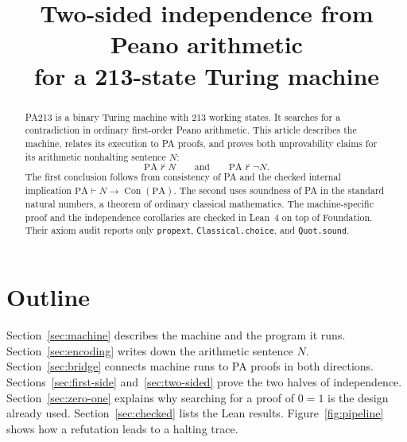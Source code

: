 \documentclass[11pt,letterpaper]{article}
\title{Two-sided independence from Peano arithmetic\\for a 213-state Turing machine}
\author{}
\date{}
\newcommand{\PA}{\mathrm{PA}}
\newcommand{\Con}{\operatorname{Con}}
\begin{document}
\maketitle
\begin{abstract}
PA213 is a binary Turing machine with 213 working states. It searches for
a contradiction in ordinary first-order Peano arithmetic. This article
describes the machine, relates its execution to PA proofs, and proves
both unprovability claims for its arithmetic nonhalting sentence $N$:
\[
\PA\nvdash N \qquad\text{and}\qquad \PA\nvdash\neg N.
\]
The first conclusion follows from consistency of PA and the checked internal
implication $\PA\vdash N\to\Con(\PA)$. The second uses soundness of PA in
the standard natural numbers, a theorem of ordinary classical mathematics.
The machine-specific proof and the independence corollaries are checked
in Lean~4 on top of Foundation. Their axiom audit reports only
\texttt{propext}, \texttt{Classical.choice}, and \texttt{Quot.sound}.
\end{abstract}

\section*{Outline}

Section~\ref{sec:machine} describes the machine and the program it runs.
Section~\ref{sec:encoding} writes down the arithmetic sentence $N$.
Section~\ref{sec:bridge} connects machine runs to PA proofs in both
directions. Sections~\ref{sec:first-side} and~\ref{sec:two-sided} prove
the two halves of independence. Section~\ref{sec:zero-one} explains why
searching for a proof of $0=1$ is the design already used.
Section~\ref{sec:checked} lists the Lean results.
Figure~\ref{fig:pipeline} shows how a refutation leads to a halting trace.
\end{document}
